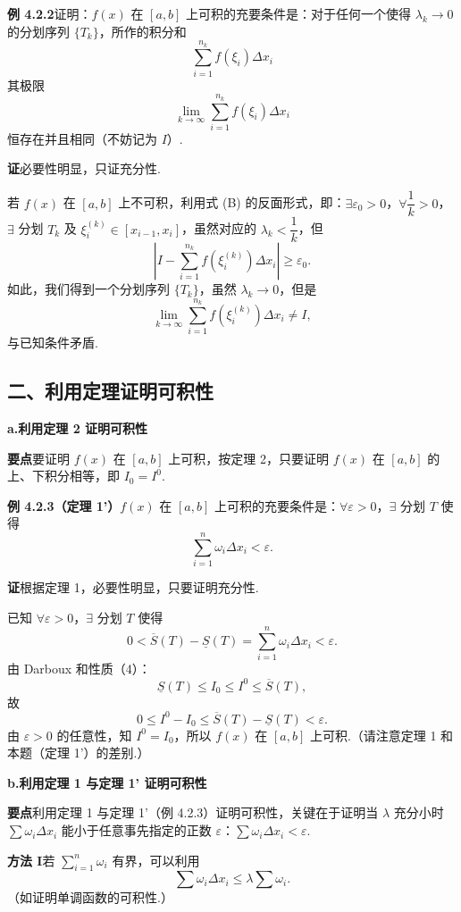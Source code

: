 \documentclass[UTF8, 12pt, fontset=fandol, oneside]{ctexart}
\begin{document}
\noindent\textbf{例 4.2.2}\quad 证明：$f(x)$ 在 $[a,b]$ 上可积的充要条件是：对于任何一个使得 $\lambda_k\to0$ 的分划序列 $\{T_k\}$，所作的积分和
\[
\sum_{i=1}^{n_k}f(\xi_i)\Delta x_i
\]
其极限
\[
\lim_{k\to\infty}\sum_{i=1}^{n_k}f(\xi_i)\Delta x_i
\]
恒存在并且相同（不妨记为 $I$）.

\noindent\textbf{证}\quad 必要性明显，只证充分性.

若 $f(x)$ 在 $[a,b]$ 上不可积，利用式 (B) 的反面形式，即：$\exists\varepsilon_0>0$，$\forall\dfrac1k>0$，$\exists$ 分划 $T_k$ 及 $\xi_i^{(k)}\in[x_{i-1},x_i]$，虽然对应的 $\lambda_k<\dfrac1k$，但
\[
\left|I-\sum_{i=1}^{n_k}f(\xi_i^{(k)})\Delta x_i\right|\ge\varepsilon_0.
\]
如此，我们得到一个分划序列 $\{T_k\}$，虽然 $\lambda_k\to0$，但是
\[
\lim_{k\to\infty}\sum_{i=1}^{n_k}f(\xi_i^{(k)})\Delta x_i\ne I,
\]
与已知条件矛盾.

\subsection*{二、利用定理证明可积性}

\noindent\textbf{a.\quad 利用定理 2 证明可积性}

\noindent\textbf{要点}\quad 要证明 $f(x)$ 在 $[a,b]$ 上可积，按定理 2，只要证明 $f(x)$ 在 $[a,b]$ 的上、下积分相等，即 $I_0=I^0$.

\noindent\textbf{例 4.2.3（定理 1'）}\quad $f(x)$ 在 $[a,b]$ 上可积的充要条件是：$\forall\varepsilon>0$，$\exists$ 分划 $T$ 使得
\[
\sum_{i=1}^n\omega_i\Delta x_i<\varepsilon.
\]

\noindent\textbf{证}\quad 根据定理 1，必要性明显，只要证明充分性.

已知 $\forall\varepsilon>0$，$\exists$ 分划 $T$ 使得
\[
0<\overline S(T)-\underline S(T)=\sum_{i=1}^n\omega_i\Delta x_i<\varepsilon.
\]
由 Darboux 和性质（4）：
\[
\underline S(T)\le I_0\le I^0\le\overline S(T),
\]
故
\[
0\le I^0-I_0\le\overline S(T)-\underline S(T)<\varepsilon.
\]
由 $\varepsilon>0$ 的任意性，知 $I^0=I_0$，所以 $f(x)$ 在 $[a,b]$ 上可积.（请注意定理 1 和本题（定理 1'）的差别.）

\noindent\textbf{b.\quad 利用定理 1 与定理 1' 证明可积性}

\noindent\textbf{要点}\quad 利用定理 1 与定理 1'（例 4.2.3）证明可积性，关键在于证明当 $\lambda$ 充分小时 $\sum\omega_i\Delta x_i$ 能小于任意事先指定的正数 $\varepsilon$：$\sum\omega_i\Delta x_i<\varepsilon$.

\noindent\textbf{方法 I}\quad 若 $\sum_{i=1}^n\omega_i$ 有界，可以利用
\[
\sum\omega_i\Delta x_i\le\lambda\sum\omega_i.
\]
（如证明单调函数的可积性.）
\end{document}

